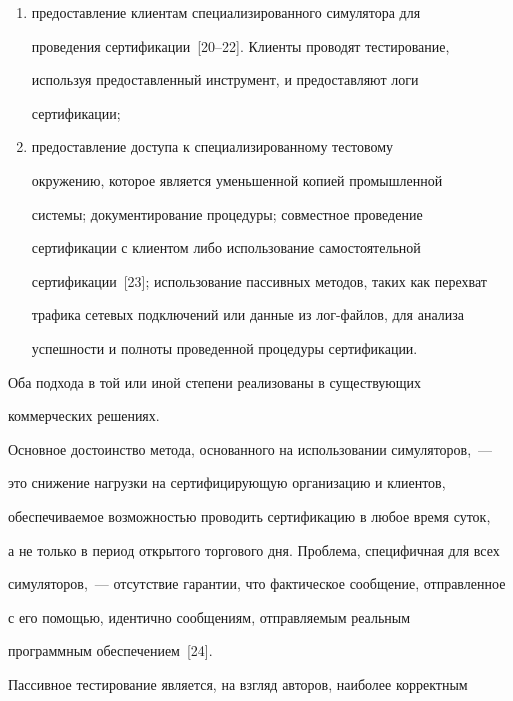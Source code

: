 \begin{enumerate}[(1)]


\item предоставление клиентам специализированного симулятора для


проведения сертификации~[20--22]. Клиенты проводят тестирование,


используя предоставленный инструмент, и предоставляют логи


сертификации;


\item предоставление доступа к специализированному тестовому


окружению, которое является уменьшенной копией промышленной


системы; документирование процедуры; совместное проведение


сертификации с клиентом либо использование самостоятельной


сертификации~[23]; использование пассивных методов, таких как перехват


трафика сетевых подключений или данные из лог-фай\-лов, для анализа


успешности и полноты проведенной процедуры сертификации.


\end{enumerate}





Оба подхода в той или иной степени реализованы в существующих


коммерческих решениях.





Основное достоинство метода, основанного на использовании симуляторов,~---


это снижение нагрузки на сертифицирующую организацию и клиентов,


обеспечиваемое возможностью проводить сертификацию в любое время суток,


а не только в период открытого торгового дня. Проблема, специфичная для всех


симуляторов,~--- отсутствие гарантии, что фактическое сообщение, отправленное


с его помощью, идентично сообщениям, отправляемым реальным


программным обеспечением~[24].





Пассивное тестирование является, на взгляд авторов, наиболее корректным



